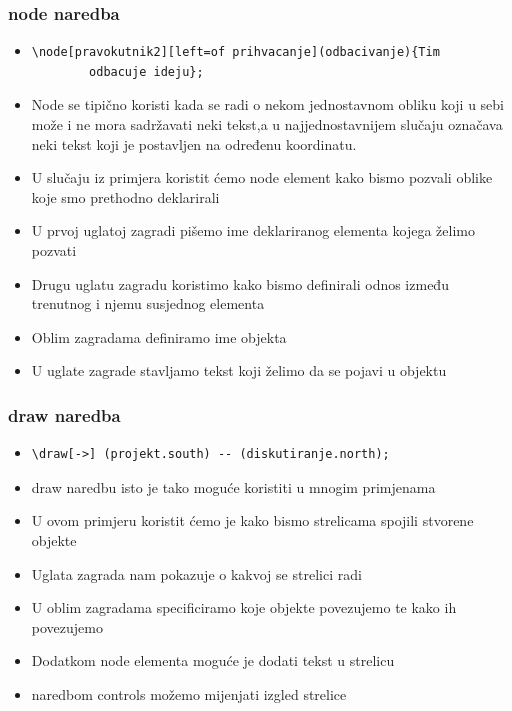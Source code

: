 \documentclass{beamer}
\begin{document}
\begin{frame}[fragile]
	\frametitle{node naredba}
		\begin{itemize}
		\item \begin{verbatim}\node[pravokutnik2][left=of prihvacanje](odbacivanje){Tim
		odbacuje ideju};\end{verbatim}
		\item Node se tipično koristi kada se radi o nekom jednostavnom obliku koji u sebi može i ne mora sadržavati neki tekst,a u najjednostavnijem slučaju označava neki tekst koji je postavljen na određenu koordinatu.
		\item U slučaju iz primjera koristit ćemo node element kako bismo pozvali oblike koje smo prethodno deklarirali
		\item U prvoj uglatoj zagradi pišemo ime deklariranog elementa kojega želimo pozvati
		\item Drugu uglatu zagradu koristimo kako bismo definirali odnos između trenutnog i njemu susjednog elementa
		\item Oblim zagradama definiramo ime objekta
		\item U uglate zagrade stavljamo tekst koji želimo da se pojavi u objektu
  		\end{itemize}	
\end{frame}

\begin{frame}[fragile]
	\frametitle{draw naredba}
		\begin{itemize}
		\item \begin{verbatim}\draw[->] (projekt.south) -- (diskutiranje.north);\end{verbatim}
		\item draw naredbu isto je tako moguće koristiti u mnogim primjenama
		\item U ovom primjeru koristit ćemo je kako bismo strelicama spojili stvorene objekte
		\item Uglata zagrada nam pokazuje o kakvoj se strelici radi 
		\item U oblim zagradama specificiramo koje objekte povezujemo te kako ih povezujemo
		\item Dodatkom node elementa moguće je dodati tekst u strelicu 
		\item naredbom controls možemo mijenjati izgled strelice
  		\end{itemize}	
\end{frame}
\end{document}

